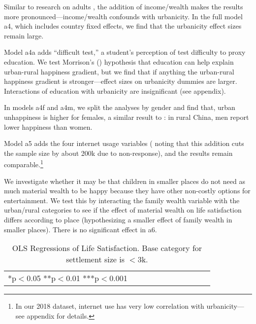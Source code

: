 \documentclass[11pt, letterpaper]{article}
\begin{document}
\begin{spacing}{1.9}
Similar to research on adults \citep{aok21}, the addition of income/wealth makes
the results more pronounced---income/wealth confounds with urbanicity.
In the full model a4, which includes country fixed effects, we find that the urbanicity effect sizes remain large.

Model a4a adds ``difficult test,'' a student's perception of test difficulty to
proxy education. We test Morrison's (\citeyear{morrison2024resolving})
hypothesis that education can help explain
urban-rural happiness gradient, but we find that if anything the urban-rural
happiness gradient is stronger---effect sizes on urbanicity dummies are
larger. Interactions of education with urbanicity are insignificant (see  appendix).

In models a4f and a4m, we split the analyses by gender and find that, urban unhappiness is higher for
females, a similar result to \citet{knight2010rural}: in rural China, men report lower happiness than women.

Model a5  adds the four internet usage variables  (%
noting that this addition cuts the sample size by about 200k due to non-response),
and the results remain comparable.\footnote{In our 2018 dataset, internet use has very low correlation with urbanicity---see appendix for details.} %

We investigate whether it may be that children in smaller places do not need as
much material wealth to be happy because they have other non-costly options for
entertainment. We test this by interacting the family wealth variable with the
urban/rural categories to see if the effect of material wealth on life
satisfaction differs according to place (hypothesizing a smaller effect of
family wealth in smaller places).
There is no significant effect in a6. 

\begin{table}[H]\centering\caption{OLS Regressions of Life Satisfaction. Base category for settlement size is $<$3k.} \label{regA} \begin{scriptsize} \begin{tabular}{p{1.6in}p{.5in}p{.5in}p{.5in}p{.5in}p{.5in}|p{.5in}p{.5in}|p{.5in}|p{.5in}p{.5in}p{.5 in}p{.5in}p{.5 in}}\hline  \hline\multicolumn{4}{l}{*p$<$0.05 **p$<$0.01 ***p$<$0.001} \end{tabular}\end{scriptsize}\end{table}




\end{spacing}
\end{document}
